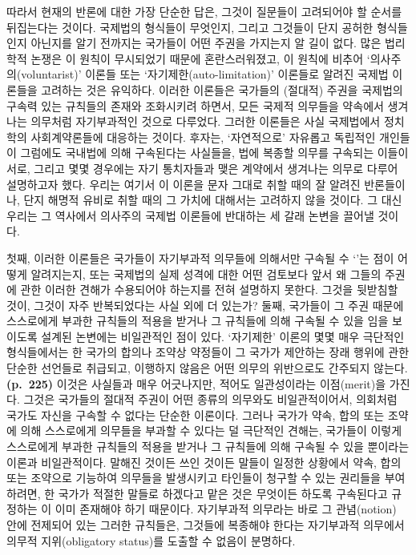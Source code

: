 따라서 현재의 반론에 대한 가장 단순한 답은, 그것이 질문들이 고려되어야
할 순서를 뒤집는다는 것이다. 국제법의 형식들이 무엇인지, 그리고 그것들이
단지 공허한 형식들인지 아닌지를 알기 전까지는 국가들이 어떤 주권을
가지는지 알 길이 없다. 많은 법리학적 논쟁은 이 원칙이 무시되었기 때문에
혼란스러워졌고, 이 원칙에 비추어 ‘의사주의(voluntarist)’ 이론들 또는
‘자기제한(auto-limitation)’ 이론들로 알려진 국제법 이론들을 고려하는
것은 유익하다. 이러한 이론들은 국가들의 (절대적) 주권을 국제법의 구속력
있는 규칙들의 존재와 조화시키려 하면서, 모든 국제적 의무들을 약속에서
생겨나는 의무처럼 자기부과적인 것으로 다루었다. 그러한 이론들은 사실
국제법에서 정치학의 사회계약론들에 대응하는 것이다. 후자는, ‘자연적으로’
자유롭고 독립적인 개인들이 그럼에도 국내법에 의해 구속된다는 사실들을,
법에 복종할 의무를 구속되는 이들이 서로, 그리고 몇몇 경우에는 자기
통치자들과 맺은 계약에서 생겨나는 의무로 다루어 설명하고자 했다. 우리는
여기서 이 이론을 문자 그대로 취할 때의 잘 알려진 반론들이나, 단지 해명적
유비로 취할 때의 그 가치에 대해서는 고려하지 않을 것이다. 그 대신 우리는
그 역사에서 의사주의 국제법 이론들에 반대하는 세 갈래 논변을 끌어낼
것이다.

첫째, 이러한 이론들은 국가들이 자기부과적 의무들에 의해서만 구속될 수
‘’는 점이 어떻게 알려지는지, 또는 국제법의 실제 성격에 대한
어떤 검토보다 앞서 왜 그들의 주권에 관한 이러한 견해가 수용되어야
하는지를 전혀 설명하지 못한다. 그것을 뒷받침할 것이, 그것이 자주
반복되었다는 사실 외에 더 있는가? 둘째, 국가들이 그 주권 때문에
스스로에게 부과한 규칙들의 적용을 받거나 그 규칙들에 의해 구속될 수 있을
임을 보이도록 설계된 논변에는 비일관적인 점이 있다. ‘자기제한’
이론의 몇몇 매우 극단적인 형식들에서는 한 국가의 합의나 조약상 약정들이
그 국가가 제안하는 장래 행위에 관한 단순한 선언들로 취급되고, 이행하지
않음은 어떤 의무의 위반으로도 간주되지 않는다. \textbf{(p.~225)} 이것은
사실들과 매우 어긋나지만, 적어도 일관성이라는 이점(merit)을 가진다.
그것은 국가들의 절대적 주권이 어떤 종류의 의무와도 비일관적이어서,
의회처럼 국가도 자신을 구속할 수 없다는 단순한 이론이다. 그러나 국가가
약속, 합의 또는 조약에 의해 스스로에게 의무들을 부과할 수 있다는 덜
극단적인 견해는, 국가들이 이렇게 스스로에게 부과한 규칙들의 적용을
받거나 그 규칙들에 의해 구속될 수 있을 뿐이라는 이론과 비일관적이다.
말해진 것이든 쓰인 것이든 말들이 일정한 상황에서 약속, 합의 또는
조약으로 기능하여 의무들을 발생시키고 타인들이 청구할 수 있는 권리들을
부여하려면, 한 국가가 적절한 말들로 하겠다고 맡은 것은 무엇이든 하도록
구속된다고 규정하는 이 이미 존재해야 하기 때문이다.
자기부과적 의무라는 바로 그 관념(notion) 안에 전제되어 있는 그러한
규칙들은, 그것들에 복종해야 한다는 자기부과적 의무에서 
의무적 지위(obligatory status)를 도출할 수 없음이 분명하다.

